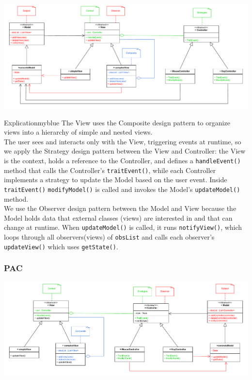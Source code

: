 \vspace{0.25cm}
\begin{center}
\includegraphics[height=0.25\textheight]{Chapters/MVC_PAC/mvc2.drawio.pdf}
\end{center}

\vspace{0.25cm}


\begin{prettyBox}{Explication}{myblue}
The View uses the Composite design pattern to organize views into a hierarchy of simple and nested views.\\[0.15cm]
The user sees and interacts only with the View, triggering events at runtime, so we apply the Strategy design
pattern between the View and Controller: the View is the context, holds a reference to the Controller, and defines
a \texttt{handleEvent()} method that calls the Controller’s \texttt{traitEvent()}, while each Controller implements
a strategy to update the Model based on the user event. Inside \texttt{traitEvent()} \texttt{modifyModel()} is called and invokes
the Model’s \texttt{updateModel()} method.\\[0.15cm]
We use the Observer design pattern between the Model and View because the Model holds data that external classes
(views) are interested in and that can change at runtime. When \texttt{updateModel()} is called, it runs \texttt{notifyView()},
which loops through all observers(views) of \texttt{obsList} and calls each observer’s \texttt{updateView()} which uses \texttt{getState()}.
\end{prettyBox}

\newpage
\subsubsection{PAC}

\vspace{0.25cm}
\begin{center}
\includegraphics[height=0.25\textheight]{Chapters/MVC_PAC/pac2.drawio.pdf}
\end{center}


